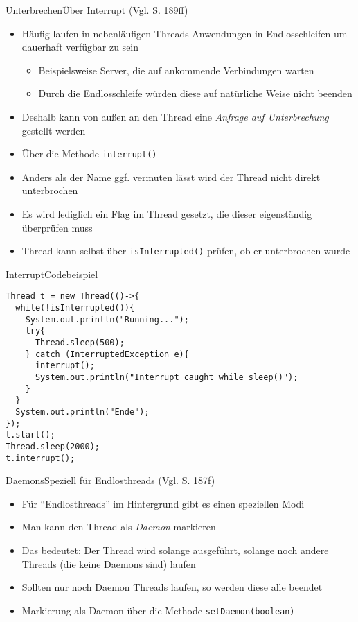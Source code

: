 \begin{frame}{Unterbrechen}{Über Interrupt (Vgl. \cite{ullenboom2014java} S. 189ff)}
    \begin{itemize}
        \item Häufig laufen in nebenläufigen Threads Anwendungen in Endlosschleifen um dauerhaft verfügbar zu sein
        \begin{itemize}
            \item Beispielsweise Server, die auf ankommende Verbindungen warten
            \item Durch die Endlosschleife würden diese auf natürliche Weise nicht beenden
        \end{itemize}
        \item Deshalb kann von außen an den Thread eine \textit{Anfrage auf Unterbrechung} gestellt werden
        \item Über die Methode \texttt{interrupt()}
        \item Anders als der Name ggf. vermuten lässt wird der Thread nicht direkt unterbrochen
        \item Es wird lediglich ein Flag im Thread gesetzt, die dieser eigenständig überprüfen muss
        \item Thread kann selbst über \texttt{isInterrupted()} prüfen, ob er unterbrochen wurde
    \end{itemize}
\end{frame}

\begin{frame}[fragile]{Interrupt}{Codebeispiel}
\lstset{style=java}
\begin{lstlisting}
Thread t = new Thread(()->{
  while(!isInterrupted()){
    System.out.println("Running...");
    try{
      Thread.sleep(500);
    } catch (InterruptedException e){
      interrupt();
      System.out.println("Interrupt caught while sleep()");
    }
  }
  System.out.println("Ende");
});
t.start();
Thread.sleep(2000);
t.interrupt();
\end{lstlisting}
\end{frame}

\begin{frame}{Daemons}{Speziell für Endlosthreads (Vgl. \cite{ullenboom2014java} S. 187f)}
    \begin{itemize}
        \item Für "`Endlosthreads"' im Hintergrund gibt es einen speziellen Modi
        \item Man kann den Thread als \textit{Daemon} markieren
        \item Das bedeutet: Der Thread wird solange ausgeführt, solange noch andere Threads (die keine Daemons sind) laufen
        \item Sollten nur noch Daemon Threads laufen, so werden diese alle beendet
        \item Markierung als Daemon über die Methode \texttt{setDaemon(boolean)}
    \end{itemize}
\end{frame}


